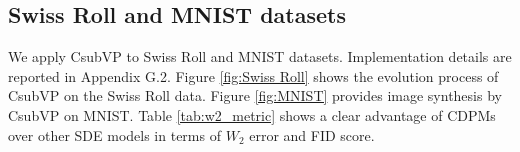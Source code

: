 \documentclass[letterpaper,10pt,reqno]{amsart}
\numberwithin{equation}{section}
\begin{document}
\subsection{Swiss Roll and MNIST datasets}
\label{sc42}
We apply CsubVP to Swiss Roll and MNIST datasets. 
Implementation details are reported in Appendix G.2.
Figure \ref{fig:Swiss Roll} shows the evolution process of CsubVP on the Swiss Roll data.
Figure \ref{fig:MNIST} provides image synthesis by CsubVP on MNIST. 
Table \ref{tab:w2_metric} shows a clear advantage of CDPMs 
over other SDE models in terms of $W_2$ error and FID score.

\end{document}
